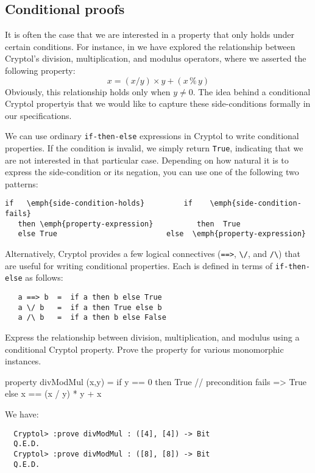 \subsection{Conditional proofs}
\label{sec:condproof}

It is often the case that we are interested in a property that only
holds under certain conditions.  For instance, in
 we have explored the
relationship between Cryptol's division, multiplication, and modulus
operators, where we asserted the following
property:\indMod\indDiv\indTimes
$$
  x = (x / y) \times y + (x\,\%\,y)
$$
Obviously, this relationship holds only when $y \not= 0$. The idea
behind a conditional Cryptol property\indThmCond is that we would like
to capture these side-conditions formally in our specifications.

We can use ordinary {\tt if-then-else} expressions in Cryptol to
write conditional properties.  If the condition is invalid, we simply return
{\tt True}, indicating that we are not interested in that particular
case. Depending on how natural it is to express the side-condition or
its negation, you can use one of the following two patterns:
\begin{Verbatim}[commandchars=\\\{\}]
   if   \emph{side-condition-holds}         if    \emph{side-condition-fails}
   then \emph{property-expression}          then  True
   else True                         else  \emph{property-expression}
\end{Verbatim}

Alternatively, Cryptol provides a few logical connectives
(\texttt{==>}, \texttt{\textbackslash/}, and \texttt{/\textbackslash})
that are useful for writing conditional properties. Each is defined in
terms of \texttt{if-then-else} as follows:

\begin{Verbatim}
   a ==> b  =  if a then b else True
   a \/ b   =  if a then True else b
   a /\ b   =  if a then b else False
\end{Verbatim}

\begin{Exercise}\label{ex:cond:1}
  Express the relationship between division, multiplication, and
  modulus using a conditional Cryptol property.  Prove the property
  for various monomorphic instances.\indMod\indDiv\indTimes\indThmCond
\end{Exercise}
\begin{Answer}
\begin{code}
  property divModMul (x,y) = if y == 0
                             then True   // precondition fails => True
                             else x == (x / y) * y + x %
\end{code}
We have:
\begin{Verbatim}
  Cryptol> :prove divModMul : ([4], [4]) -> Bit
  Q.E.D.
  Cryptol> :prove divModMul : ([8], [8]) -> Bit
  Q.E.D.
\end{Verbatim}
\end{Answer}

